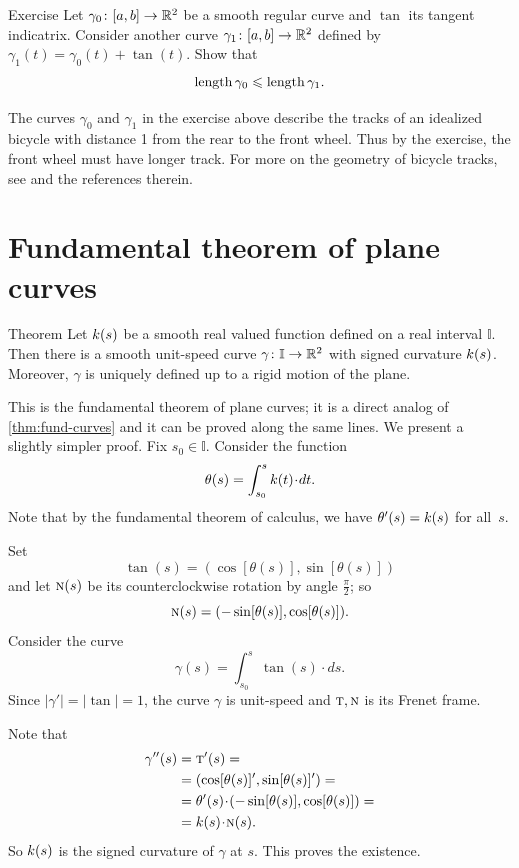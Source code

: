 \begin{thm}{Exercise}\label{ex:bike}
Let $\gamma_0\colon[a,b]\to\mathbb{R}^2$ be a smooth regular curve and $\tan$ its tangent indicatrix.
Consider another curve $\gamma_1\colon[a,b]\to\mathbb{R}^2$ defined by $\gamma_1(t)=\gamma_0(t)+\tan(t)$.
Show that
\[\mathop{\rm length}\nolimits\gamma_0\leqslant \mathop{\rm length}\nolimits\gamma_1.\]

\end{thm}

The curves $\gamma_0$ and $\gamma_1$ in the exercise above describe the tracks of an idealized bicycle with  distance 1 from the rear to the front wheel.
Thus by the exercise, the front wheel must have longer track.
For more on the geometry of bicycle tracks, see \cite{FLT} and the references therein.

\section{Fundamental theorem of plane curves}

\begin{thm}{Theorem}\label{thm:fund-curves-2D}
Let $k(s)$ be a smooth real valued function defined on a real interval $\mathbb{I}$.
Then there is a smooth unit-speed curve $\gamma\colon\mathbb{I}\to\mathbb{R}^2$ with signed curvature $k(s)$.
Moreover, $\gamma$ is uniquely defined up to a rigid motion of the plane.
\end{thm}

This is the fundamental theorem of plane curves; it is a direct analog of \ref{thm:fund-curves} and it can be proved along the same lines.
We present a slightly simpler proof.
Fix $s_0\in\mathbb{I}$.
Consider the function
\[\theta(s)=\int_{s_0}^s\skur(t)\cdot dt.\]
Note that by the fundamental theorem of calculus, we have $\theta'(s)\z=\skur(s)$ for all~$s$.

Set 
\[\tan(s)=(\cos[\theta(s)],\sin[\theta(s)])\] and let $\textsc{n}(s)$ be its counterclockwise rotation by angle $\tfrac\pi2$; so 
\[\textsc{n}(s)=(-\sin[\theta(s)],\cos[\theta(s)]).\]
Consider the curve 
\[\gamma(s)=\int_{s_0}^s\tan(s)\cdot ds.\]
Since $|\gamma'|=|\tan|=1$, the curve $\gamma$ is unit-speed and $\textsc{t},\textsc{n}$ is its Frenet frame. 

Note that
\begin{align*}
\gamma''(s)&=\tan'(s)=
\\
&=(\cos[\theta(s)]',\sin[\theta(s)]')=
\\
&=\theta'(s)\cdot (-\sin[\theta(s)],\cos[\theta(s)])=
\\
&=\skur(s)\cdot \norm(s).
\end{align*}
So $k(s)$ is the signed curvature of $\gamma$ at $s$. This proves the existence.

